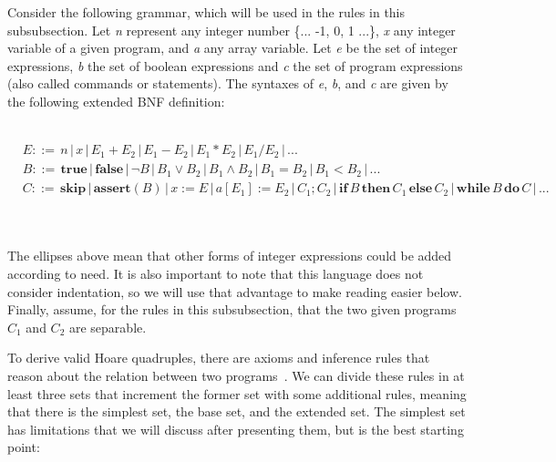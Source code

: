 Consider the following grammar, which will be used in the rules in this subsubsection.
Let \emph{n} represent any integer number \{... -1, 0, 1 ...\}, \emph{x} any integer variable of a given program, and \emph{a} any array variable.
Let \emph{e} be the set of integer expressions, \emph{b} the set of boolean expressions and \emph{c} the set of program expressions (also called commands or statements).
The syntaxes of \emph{e}, \emph{b}, and \emph{c} are given by the following extended BNF definition:\\ \\
\noindent\hspace*{1em}
\begin{minipage}{\dimexpr\linewidth-2em\relax}
\[\begin{aligned} 
& E ::= \, n \,|\, x \,|\, E_1 + E_2 \,|\, E_1 - E_2 \,|\, E_1 * E_2 \,|\, E_1 / E_2 \,|\, ... &\\
& B ::= \, \textbf{true} \,|\, \textbf{false} \,|\, \neg B \,|\, B_1 \lor B_2 \,|\, B_1 \land B_2 \,|\, B_1 = B_2 \,|\, B_1 < B_2 \,|\, ... &\\
& C ::= \, \textbf{skip} \,|\, \textbf{assert} (B) \,|\, x := E \,|\, a[E_1] := E_2 \,|\, C_1;C_2 \,|\, \textbf{if}\, B\, \textbf{then}\, C_1\, \textbf{else}\, C_2 \,|\, \textbf{while}\, B\, \textbf{do}\, C \,|\, ... &
\end{aligned}\]
\end{minipage}\\ \\

The ellipses above mean that other forms of integer expressions could be added according to need.
It is also important to note that this language does not consider indentation, so we will use that advantage to make reading easier below.
Finally, assume, for the rules in this subsubsection, that the two given programs \emph{$C_1$} and \emph{$C_2$} are separable.

To derive valid Hoare quadruples, there are axioms and inference rules that reason about the relation between two programs~\cite{DBLP:journals/jlp/BartheCK16}.
We can divide these rules in at least three sets that increment the former set with some additional rules, meaning that there is the simplest set, the base set, and the extended set.
The simplest set has limitations that we will discuss after presenting them, but is the best starting point:

